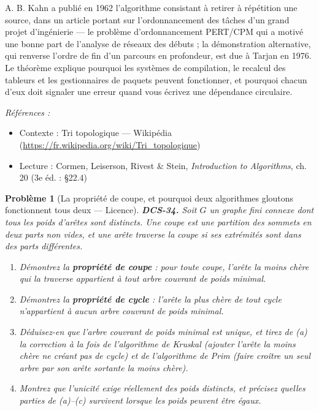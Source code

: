 \documentclass[11pt]{article}
\newtheorem{problem}{Problème}
\newenvironment{refs}{\par\small\noindent\emph{Références :}\begin{itemize}\setlength\itemsep{0pt}}{\end{itemize}\normalsize}
\begin{document}
\noindent A. B. Kahn a publié en 1962 l'algorithme consistant à retirer à répétition une source, dans un article portant sur l'ordonnancement des tâches d'un grand projet d'ingénierie --- le problème d'ordonnancement PERT/CPM qui a motivé une bonne part de l'analyse de réseaux des débuts ; la démonstration alternative, qui renverse l'ordre de fin d'un parcours en profondeur, est due à Tarjan en 1976. Le théorème explique pourquoi les systèmes de compilation, le recalcul des tableurs et les gestionnaires de paquets peuvent fonctionner, et pourquoi chacun d'eux doit signaler une erreur quand vous écrivez une dépendance circulaire.

\begin{refs}
\item Contexte : Tri topologique --- Wikipédia (\url{https://fr.wikipedia.org/wiki/Tri_topologique})
\item Lecture : Cormen, Leiserson, Rivest \& Stein, \textit{Introduction to Algorithms}, ch. 20 (3e éd. : \S{}22.4)
\end{refs}

\bigskip

\begin{problem}[{La propriété de coupe, et pourquoi deux algorithmes gloutons fonctionnent tous deux --- Licence}]
\textbf{DCS-34.} Soit $G$ un graphe fini connexe dont tous les poids d'arêtes sont distincts. Une \textit{coupe} est une partition des sommets en deux parts non vides, et une arête \textit{traverse} la coupe si ses extrémités sont dans des parts différentes.
\begin{enumerate}
\item[(a)] Démontrez la \textbf{propriété de coupe} : pour toute coupe, l'arête la moins chère qui la traverse appartient à tout arbre couvrant de poids minimal.
\item[(b)] Démontrez la \textbf{propriété de cycle} : l'arête la plus chère de tout cycle n'appartient à aucun arbre couvrant de poids minimal.
\item[(c)] Déduisez-en que l'arbre couvrant de poids minimal est unique, et tirez de (a) la correction à la fois de l'algorithme de Kruskal (ajouter l'arête la moins chère ne créant pas de cycle) et de l'algorithme de Prim (faire croître un seul arbre par son arête sortante la moins chère).
\item[(d)] Montrez que l'unicité exige réellement des poids distincts, et précisez quelles parties de (a)--(c) survivent lorsque les poids peuvent être égaux.
\end{enumerate}

\end{problem}
\end{document}
